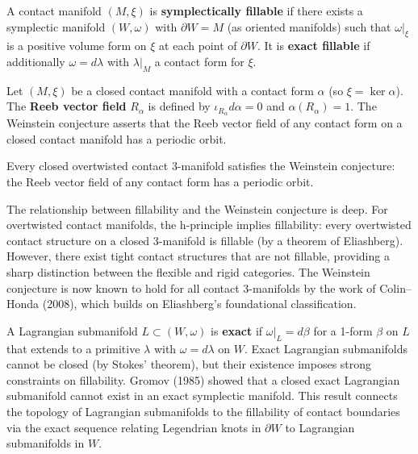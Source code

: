 \begin{definition}
A contact manifold $(M, \xi)$ is \textbf{symplectically fillable} if there exists a symplectic manifold $(W, \omega)$ with $\partial W = M$ (as oriented manifolds) such that $\omega|_{\xi}$ is a positive volume form on $\xi$ at each point of $\partial W$. It is \textbf{exact fillable} if additionally $\omega = d\lambda$ with $\lambda|_M$ a contact form for $\xi$.
\end{definition}

\begin{definition}
Let $(M, \xi)$ be a closed contact manifold with a contact form $\alpha$ (so $\xi = \ker \alpha$). The \textbf{Reeb vector field} $R_\alpha$ is defined by $\iota_{R_\alpha} d\alpha = 0$ and $\alpha(R_\alpha) = 1$. The Weinstein conjecture asserts that the Reeb vector field of any contact form on a closed contact manifold has a periodic orbit.
\end{definition}

\begin{theorem}[Hofer, 1993]
Every closed overtwisted contact 3-manifold satisfies the Weinstein conjecture: the Reeb vector field of any contact form has a periodic orbit.
\end{theorem}

\begin{remark}
The relationship between fillability and the Weinstein conjecture is deep. For overtwisted contact manifolds, the h-principle implies fillability: every overtwisted contact structure on a closed 3-manifold is fillable (by a theorem of Eliashberg). However, there exist tight contact structures that are not fillable, providing a sharp distinction between the flexible and rigid categories. The Weinstein conjecture is now known to hold for all contact 3-manifolds by the work of Colin--Honda (2008), which builds on Eliashberg's foundational classification.
\end{remark}

\begin{remark}
A Lagrangian submanifold $L \subset (W, \omega)$ is \textbf{exact} if $\omega|_L = d\beta$ for a 1-form $\beta$ on $L$ that extends to a primitive $\lambda$ with $\omega = d\lambda$ on $W$. Exact Lagrangian submanifolds cannot be closed (by Stokes' theorem), but their existence imposes strong constraints on fillability. Gromov (1985) showed that a closed exact Lagrangian submanifold cannot exist in an exact symplectic manifold. This result connects the topology of Lagrangian submanifolds to the fillability of contact boundaries via the exact sequence relating Legendrian knots in $\partial W$ to Lagrangian submanifolds in $W$.
\end{remark}


